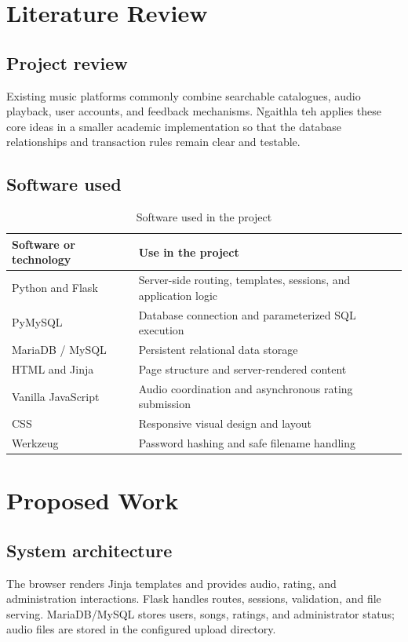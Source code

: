 \documentclass[12pt,a4paper]{article}
\newcommand{\chaptertitle}[1]{%
  \clearpage
  \section{#1}%
  \thispagestyle{chapterstart}%
}
\newcommand{\projectname}{Ngaithla teh}
\begin{document}
\chaptertitle{Literature Review}

\subsection{Project review}
Existing music platforms commonly combine searchable catalogues, audio playback, user accounts, and feedback mechanisms. \projectname{} applies these core ideas in a smaller academic implementation so that the database relationships and transaction rules remain clear and testable.

\subsection{Software used}
\begin{table}[H]
\centering
\begin{tabularx}{\textwidth}{lX}
\toprule
\textbf{Software or technology} & \textbf{Use in the project} \\
\midrule
Python and Flask & Server-side routing, templates, sessions, and application logic \\
PyMySQL & Database connection and parameterized SQL execution \\
MariaDB / MySQL & Persistent relational data storage \\
HTML and Jinja & Page structure and server-rendered content \\
Vanilla JavaScript & Audio coordination and asynchronous rating submission \\
CSS & Responsive visual design and layout \\
Werkzeug & Password hashing and safe filename handling \\
\bottomrule
\end{tabularx}
\caption{Software used in the project}
\end{table}

\chaptertitle{Proposed Work}

\subsection{System architecture}
The browser renders Jinja templates and provides audio, rating, and
administration interactions. Flask handles routes, sessions, validation, and
file serving. MariaDB/MySQL stores users, songs, ratings, and administrator
status; audio files are stored in the configured upload directory.
\end{document}
